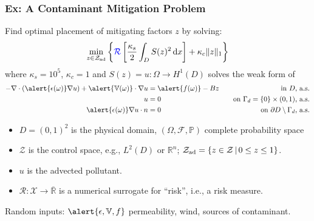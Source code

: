 \documentclass[aspectratio=169,xcolor=dvipsnames,10pt]{beamer}
\newcommand{\bbp}{\mathbb{P}}
\newcommand{\Zad}{\mathcal{Z}_{\text{\textup{ad}}}}
\newcommand{\risk}{\mathcal{R}}
\begin{document}
\begin{frame}\frametitle{Ex: A Contaminant Mitigation Problem}
\begin{exampleblock}{}
\smaller
Find optimal placement of mitigating factors $z$ by solving:
\begin{equation*}\label{eq:optprob_ex2}
  \min_{z\in\Zad}\left\{
    {\color{blue}\risk}\left[\frac{\kappa_s}{2}\int_{D} S(z)^2\,\mathrm{d}x\right]
       + \kappa_c \|z\|_1\right\}
\end{equation*}
where
 $\kappa_s = 10^5$, $\kappa_c =1$ and $S(z) = u:\Omega\to H^1(D)$ solves
the weak form of
\begin{align*}
  -\nabla\cdot(\alert{\epsilon(\omega)}\nabla u) + \alert{\mathbb{V}(\omega)}\cdot\nabla u
    &= \alert{f(\omega)} - Bz &\quad\text{in $D$, a.s.}\\
  u &=0 &\quad \text{on $\Gamma_d = \{0\}\times(0,1)$, a.s.} \\
 \alert{ \epsilon(\omega)}\nabla u\cdot n &= 0 &\quad\text{on $\partial D\setminus\Gamma_d$, a.s.}
\end{align*}
\begin{itemize}\vspace*{-3ex}
\item $D = (0,1)^2$ is the physical domain, $(\Omega,\mathcal{F}, \bbp)$ complete probability space
\item $\mathcal{Z}$ is the control space, e.g., $L^2(D)$ or $\mathbb R^n$; $\Zad = \{z\in \mathcal{Z}\,\vert\,0\le z\le 1\}$.
\item $u$ is the advected pollutant.
\item $\risk : \mathcal{X} \to \overline{\mathbb R}$ is a numerical surrogate for ``risk'', i.e., a risk measure.
\end{itemize}
Random inputs: $\alert{\epsilon, \mathbb V, f}$ permeability, wind, sources of contaminant.
\end{exampleblock}
\end{frame}
\end{document}
